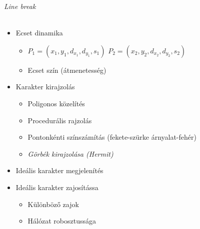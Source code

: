 \textit{Line break}\\\\

\begin{itemize}
\item Ecset dinamika
	\begin{itemize}
	\item \(P_1 = (x_1, y_1, d_{x_1}, d_{y_1}, s_1)\) \(P_2 = (x_2, y_2, d_{x_2}, d_{y_2}, s_2)\)
	\item Ecset szín (átmenetesség)
	\end{itemize}
\item Karakter kirajzolás
	\begin{itemize}
	\item Poligonos közelítés
	\item Procedurális rajzolás
	\item Pontonkénti színszámítás (fekete-szürke árnyalat-fehér)
	\item \textit{Görbék kirajzolása (Hermit)}
	\end{itemize}
\item Ideális karakter megjelenítés
\item Ideális karakter zajosítássa
	\begin{itemize}
	\item Különböző zajok
	\item Hálózat robosztussága
	\end{itemize}
\end{itemize}

